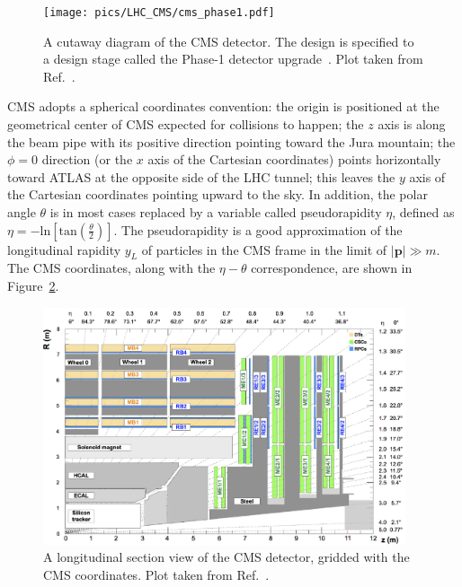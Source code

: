 \begin{figure}[!htb]
    \centering
    \captionsetup{justification=justified}
    \texttt{[image: pics/LHC\_CMS/cms\_phase1.pdf]}
    \caption{A cutaway diagram of the CMS detector. 
             The design is specified to a design stage called the Phase-1 detector upgrade~\cite{arXiv:2012.14304, Mans:1481837,Tapper:1556311}.
             Plot taken from Ref.~\cite{Sakuma:2665537}.}
    \label{fig:cms_detector}
\end{figure}

CMS adopts a spherical coordinates convention: the origin is positioned at the geometrical center of CMS expected for collisions to happen;
the $z$ axis is along the beam pipe with its positive direction pointing toward the Jura mountain;
the $\phi = 0$ direction (or the $x$ axis of the Cartesian coordinates) points horizontally toward ATLAS at the opposite side of the LHC tunnel;
this leaves the $y$ axis of the Cartesian coordinates pointing upward to the sky.
In addition, the polar angle $\theta$ is in most cases replaced by a variable called pseudorapidity $\eta$, 
defined as $\eta = -\text{ln}[\text{tan}(\frac{\theta}{2})]$.
The pseudorapidity is a good approximation of the longitudinal rapidity $y_{L}$ of particles in the CMS frame in the limit of $|\textbf{p}| \gg m$.
The CMS coordinates, along with the $\eta - \theta$ correspondence, are shown in Figure~\ref{fig:cms_longitudinal}.

\begin{figure}[!htb]
    \centering
    \captionsetup{justification=justified}
    \includegraphics[width=0.95\textwidth]{pics/LHC_CMS/CMS_longitudinal.png}
    \caption{A longitudinal section view of the CMS detector, gridded with the CMS coordinates.
             Plot taken from Ref.~\cite{Sirunyan_2018}.}
    \label{fig:cms_longitudinal}
\end{figure}


